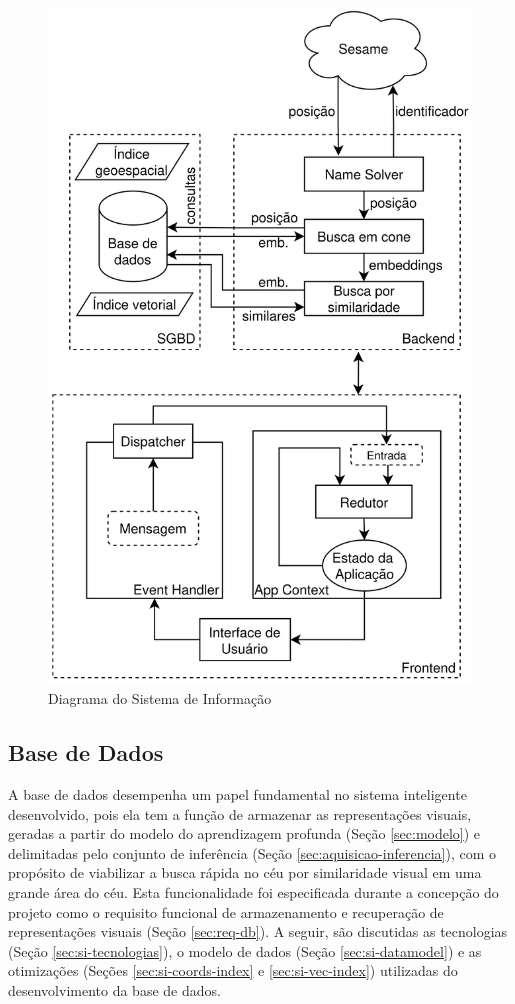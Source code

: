 \begin{figure}[!ht]
  \centering
  \includegraphics[width=0.75\linewidth]{figures/si.png}
  \caption{Diagrama do Sistema de Informação}
  \label{fig:si}
\end{figure}





\subsection{Base de Dados}
\label{sec:si-db}

A base de dados desempenha um papel fundamental no sistema inteligente desenvolvido, pois ela tem a função de armazenar as representações visuais, geradas a partir do modelo do aprendizagem profunda (Seção \ref{sec:modelo}) e delimitadas pelo conjunto de inferência (Seção \ref{sec:aquisicao-inferencia}), com o propósito de viabilizar a busca rápida no céu por similaridade visual em uma grande área do céu. Esta funcionalidade foi especificada durante a concepção do projeto como o  requisito funcional de armazenamento e recuperação de representações visuais (Seção \ref{sec:req-db}). A seguir, são discutidas as tecnologias  (Seção \ref{sec:si-tecnologias}), o modelo de dados (Seção \ref{sec:si-datamodel}) e as otimizações (Seções \ref{sec:si-coords-index} e \ref{sec:si-vec-index}) utilizadas do desenvolvimento da base de dados.

